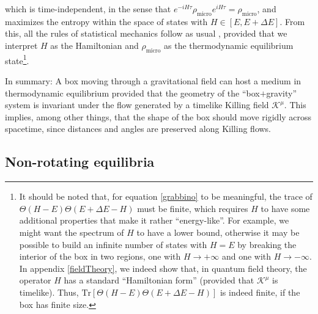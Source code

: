 \documentclass[a4paper, amsfonts, amssymb, amsmath, reprint, showkeys, nofootinbib, twoside, onecolumn,notitlepage]{revtex4-1}
\newcommand{\K}{{\mathcal{K}}}
\theoremstyle{definition}
\theoremstyle{theorem}
\begin{document}
which is time-independent, in the sense that $e^{-iH\tau}\rho_\text{micro}e^{iH\tau}=\rho_\text{micro}$, and maximizes the entropy within the space of states with $H\in [E,E{+}\Delta E]$. From this, all the rules of statistical mechanics follow as usual \cite[\S 6.2]{huang_book}, provided that we interpret $H$ as the Hamiltonian and $\rho_\text{micro}$ as the thermodynamic equilibrium state\footnote{It should be noted that, for equation \eqref{grabbino} to be meaningful, the trace of $\Theta(H{-}E)\Theta(E{+}\Delta E{-}H)$ must be finite, which requires $H$ to have some additional properties that make it rather ``energy-like''. For example, we might want the spectrum of $H$ to have a lower bound, otherwise it may be possible to build an infinite number of states with $H=E$ by breaking the interior of the box in two regions, one with $H{\rightarrow} +\infty$ and one with $H{\rightarrow} -\infty$. In appendix \ref{fieldTheory}, we indeed show that, in quantum field theory, the operator $H$ has a standard ``Hamiltonian form'' (provided that $\K^\mu$ is timelike). Thus, $\text{Tr}[\Theta(H{-}E)\Theta(E{+}\Delta E{-}H)]$ is indeed finite, if the box has finite size.}.

In summary: A box moving through a gravitational field can host a medium in thermodynamic equilibrium provided that the geometry of the ``box$+$gravity'' system is invariant under the flow generated by a timelike Killing field $\K^\mu$. This implies, among other things, that the shape of the box should move rigidly across spacetime, since distances and angles are preserved along Killing flows.

\subsection{Non-rotating equilibria}\label{Non-rotazio}
\end{document}
